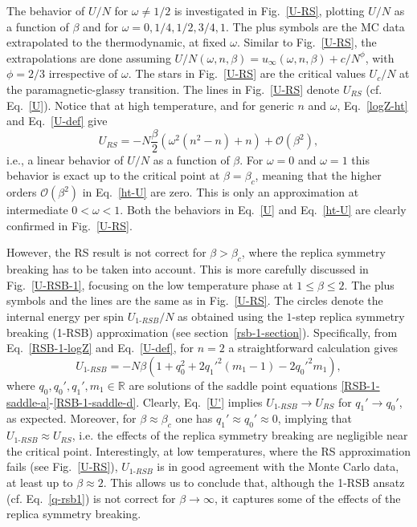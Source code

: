 \documentclass[twocolumn,superscriptaddress,prb,10pt]{revtex4-1}
\begin{document}
The behavior of $U/N$ for $\omega\ne1/2$ is investigated in Fig.~\ref{U-RS},
plotting $U/N$ as a function of $\beta$ and for $\omega=0,1/4,1/2,3/4,1$. The plus symbols 
are the MC data extrapolated to the thermodynamic, at fixed $\omega$. Similar to Fig.~\ref{U-RS}, 
the extrapolations are done assuming $U/N(\omega,n,\beta)=u_{\infty}(\omega,n,\beta)+
c/N^{\phi}$, with $\phi=2/3$ irrespective of $\omega$. The stars in Fig.~\ref{U-RS} are 
the critical values $U_c/N$ at the paramagnetic-glassy transition. The lines in Fig.~\ref{U-RS} 
denote $U_{RS}$ (cf. Eq.~\eqref{U}). 
Notice that at high temperature, and for generic $n$ and $\omega$, Eq.~\eqref{logZ-ht} and Eq.~\eqref{U-def} 
give  
%
\begin{equation}
U_{RS}= -N\frac{\beta}{2}(\omega^2(n^2-n)+n)+{\mathcal O}(\beta^2), 
\label{ht-U}
\end{equation}
%
i.e., a linear behavior of $U/N$ as a function of $\beta$. For $\omega=0$ and $\omega=1$ 
this behavior is exact up to the critical point at $\beta=\beta_c$, meaning that the higher 
orders ${\mathcal O}(\beta^2)$ in Eq.~\eqref{ht-U} are zero. This is only an approximation 
at intermediate $0<\omega<1$. Both the behaviors in Eq.~\eqref{U} and Eq.~\eqref{ht-U} are 
clearly confirmed in Fig.~\ref{U-RS}. 

However, the RS result is not correct for $\beta>\beta_c$, where the replica symmetry breaking 
has to be taken into account. This is  more carefully 
discussed in Fig.~\ref{U-RSB-1}, focusing on the low temperature phase at $1\le\beta\le 2$. 
The plus symbols and the lines are the same as in Fig.~\ref{U-RS}. The circles denote the 
internal energy per spin $U_{1\textrm{-}RSB}/N$ as obtained using the $1$-step replica 
symmetry breaking (1-RSB) approximation (see section~\ref{rsb-1-section}). Specifically, 
from Eq.~\eqref{RSB-1-logZ} and Eq.~\eqref{U-def}, for $n=2$ a straightforward calculation 
gives 
%
\begin{equation}
U_{1\textrm{-}RSB}=-N\beta(1+q_0^2+2q_1'^2(m_1-1)-2q_0'^2m_1), 
\label{U'}
\end{equation}
%
where $q_0,q_0',q_1',m_1\in\mathbb{R}$ are solutions of the saddle point 
equations \eqref{RSB-1-saddle-a}-\eqref{RSB-1-saddle-d}. Clearly, Eq.~\eqref{U'} 
implies $U_{1\textrm{-}RSB}\to U_{RS}$ for $q_1'\to q_0'$, as expected. 
Moreover, for $\beta\approx\beta_c$ one has $q_1'\approx q_0'\approx0$, implying   
that $U_{1\textrm{-}RSB}\approx U_{RS}$, i.e. the effects of the replica symmetry 
breaking are negligible near the critical point. Interestingly, at low temperatures, where the 
RS approximation fails (see Fig.~\ref{U-RS}), $U_{1\textrm{-}RSB}$ 
is in good agreement with the Monte Carlo data, at least up to $\beta\approx 2$.  
This allows us to conclude that, although the 1-RSB ansatz (cf. Eq.~\eqref{q-rsb1}) 
is not correct for $\beta\to\infty$, it captures some of the effects 
of the replica symmetry breaking.  
\end{document}

